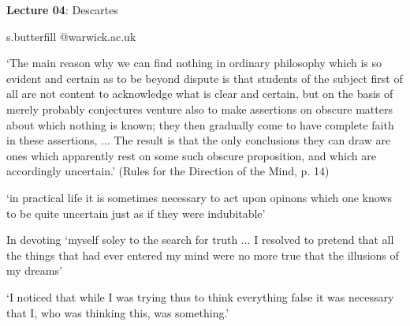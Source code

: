 \documentclass[12pt]{extarticle}
\date{}
\makeatletter
\def \ititle {Descartes}
\def \isubtitle {Lecture 02}
\def \iemail{s.butterfill @warwick.ac.uk}
\makeatother
\begin{document}
\begin{multicols*}{3}

\setlength\footnotesep{1em}












      

    
      
\def \ititle {Lecture 04}
 
\def \isubtitle {Descartes}
 
\begin{center}
 
{\Large
 
\textbf{\ititle}: \isubtitle
 
}
 
 
 
\iemail %
 
\end{center}
 
‘The main reason why we can find nothing in ordinary philosophy which is so evident and certain as to be beyond dispute is that students of the subject first of all are not content to acknowledge what is clear and certain, but on the basis of merely probably conjectures venture also to make assertions on obscure matters about which nothing is known; they then gradually come to have complete faith in these assertions, ... The result is that the only conclusions they can draw are ones which apparently rest on some such obscure proposition, and which are accordingly uncertain.’ (Rules for the Direction of the Mind, p. 14)
\citep[p.~14, AT X:367--8]{descartes:1985_csm1}
 
‘in practical life 
it is sometimes necessary to act upon opinons which one knows to be quite uncertain just as if they were indubitable’
\citep[p.~126 AT 6:31]{descartes:1985_csm1}
 
In devoting ‘myself soley to the search for truth
... I resolved to 
pretend
 that all the things that had ever
entered my mind were no more true
that the illusions of my dreams’
\citep[p.~127 AT 6:32]{descartes:1985_csm1}
 
‘I noticed that while I was trying thus to think everything false
it was necessary that I,
who was thinking this,
was something.’
\citep[p.~126 AT 6:31]{descartes:1985_csm1}
 

\end{multicols*}
\end{document}
